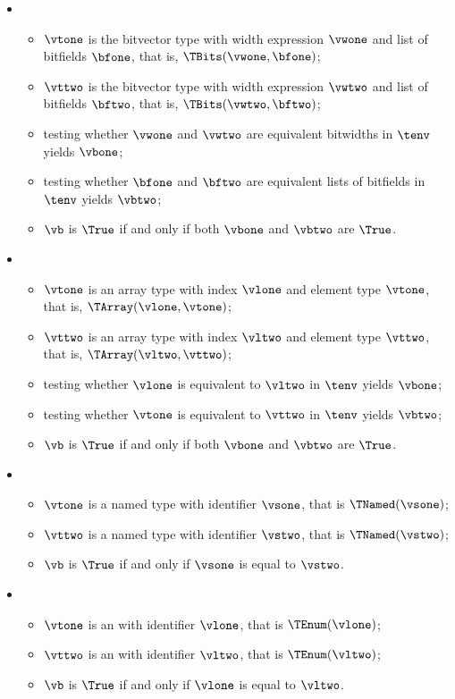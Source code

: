\begin{itemize}
  \item {}
  \begin{itemize}
    \item $\vtone$ is the bitvector type with width expression $\vwone$ and list of bitfields $\bfone$, that is, $\TBits(\vwone, \bfone)$;
    \item $\vttwo$ is the bitvector type with width expression $\vwtwo$ and list of bitfields $\bftwo$, that is, $\TBits(\vwtwo, \bftwo)$;
    \item testing whether $\vwone$ and $\vwtwo$ are equivalent bitwidths in $\tenv$ yields $\vbone$\ProseOrTypeError;
    \item testing whether $\bfone$ and $\bftwo$ are equivalent lists of bitfields in $\tenv$ yields $\vbtwo$\ProseOrTypeError;
    \item $\vb$ is $\True$ if and only if both $\vbone$ and $\vbtwo$ are $\True$.
  \end{itemize}

  \item {}
  \begin{itemize}
    \item $\vtone$ is an array type with index $\vlone$ and element type $\vtone$, that is, $\TArray(\vlone, \vtone)$;
    \item $\vttwo$ is an array type with index $\vltwo$ and element type $\vttwo$, that is, $\TArray(\vltwo, \vttwo)$;
    \item testing whether $\vlone$ is equivalent to $\vltwo$ in $\tenv$ yields $\vbone$\ProseOrTypeError;
    \item testing whether $\vtone$ is equivalent to $\vttwo$ in $\tenv$ yields $\vbtwo$\ProseOrTypeError;
    \item $\vb$ is $\True$ if and only if both $\vbone$ and $\vbtwo$ are $\True$.
  \end{itemize}

  \item {}
  \begin{itemize}
    \item $\vtone$ is a named type with identifier $\vsone$, that is $\TNamed(\vsone)$;
    \item $\vttwo$ is a named type with identifier $\vstwo$, that is $\TNamed(\vstwo)$;
    \item $\vb$ is $\True$ if and only if $\vsone$ is equal to $\vstwo$.
  \end{itemize}

  \item {}
  \begin{itemize}
    \item $\vtone$ is an \enumerationtypeterm{} with identifier $\vlone$, that is $\TEnum(\vlone)$;
    \item $\vttwo$ is an \enumerationtypeterm{} with identifier $\vltwo$, that is $\TEnum(\vltwo)$;
    \item $\vb$ is $\True$ if and only if $\vlone$ is equal to $\vltwo$.
  \end{itemize}


\end{itemize}
